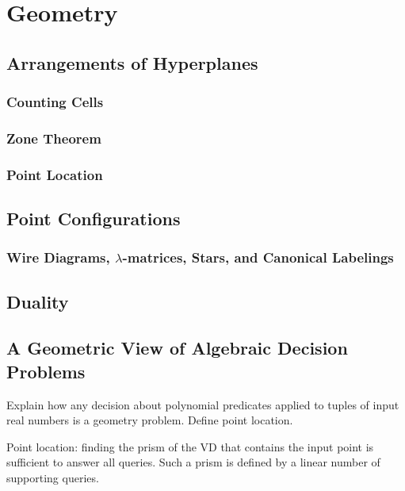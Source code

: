 \chapter{Geometry}

\section{Arrangements of Hyperplanes}

\subsection{Counting Cells}

\subsection{Zone Theorem}


\subsection{Point Location}

\section{Point Configurations}

\subsection{Wire Diagrams, \(\lambda\)-matrices, Stars, and Canonical Labelings}


\section{Duality}



\section{A Geometric View of Algebraic Decision Problems}

Explain how any decision about polynomial predicates applied to tuples of input
real numbers is a geometry problem. Define point location.

Point location: finding the prism of the VD that contains the input point is
sufficient to answer all queries. Such a prism is defined by a linear number of
supporting queries.

